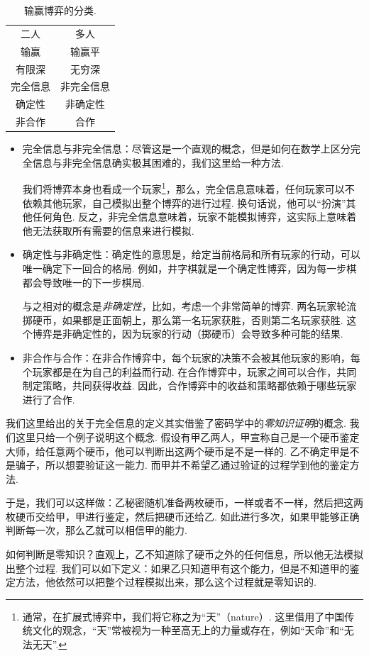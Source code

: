 \begin{table}[ht]
    \centering
    \begin{tabular}{cc}
        \toprule
        二人 & 多人 \\
        输赢 & 输赢平\\
        有限深 & 无穷深 \\
        完全信息 & 非完全信息 \\
        确定性 & 非确定性 \\
        非合作 & 合作\\
        \bottomrule
    \end{tabular}
    \caption{输赢博弈的分类.}
    \label{tab:win-lose-game}
\end{table}

\begin{itemize}
    \item 完全信息与非完全信息：尽管这是一个直观的概念，但是如何在数学上区分完全信息与非完全信息确实极其困难的，我们这里给一种方法. 
    
    我们将博弈本身也看成一个玩家\footnote{通常，在扩展式博弈中，我们将它称之为“天”（nature）. 这里借用了中国传统文化的观念，“天”常被视为一种至高无上的力量或存在，例如“天命”和“无法无天”. }，那么，完全信息意味着，任何玩家可以不依赖其他玩家，自己模拟出整个博弈的进行过程. 换句话说，他可以“扮演”其他任何角色. 反之，非完全信息意味着，玩家不能模拟博弈，这实际上意味着他无法获取所有需要的信息来进行模拟. 

    \item 确定性与非确定性：确定性的意思是，给定当前格局和所有玩家的行动，可以唯一确定下一回合的格局. 例如，井字棋就是一个确定性博弈，因为每一步棋都会导致唯一的下一步棋局.
    
    与之相对的概念是\textit{非确定性}，比如，考虑一个非常简单的博弈. 两名玩家轮流掷硬币，如果都是正面朝上，那么第一名玩家获胜，否则第二名玩家获胜. 这个博弈是非确定性的，因为玩家的行动（掷硬币）会导致多种可能的结果.

    \item 非合作与合作：在非合作博弈中，每个玩家的决策不会被其他玩家的影响，每个玩家都是在为自己的利益而行动. 在合作博弈中，玩家之间可以合作，共同制定策略，共同获得收益. 因此，合作博弈中的收益和策略都依赖于哪些玩家进行了合作. 
\end{itemize}

\begin{remark}
    我们这里给出的关于完全信息的定义其实借鉴了密码学中的\textit{零知识证明}的概念. 我们这里只给一个例子说明这个概念. 假设有甲乙两人，甲宣称自己是一个硬币鉴定大师，给任意两个硬币，他可以判断出这两个硬币是不是一样的. 乙不确定甲是不是骗子，所以想要验证这一能力. 而甲并不希望乙通过验证的过程学到他的鉴定方法. 
    
    于是，我们可以这样做：乙秘密随机准备两枚硬币，一样或者不一样，然后把这两枚硬币交给甲，甲进行鉴定，然后把硬币还给乙. 如此进行多次，如果甲能够正确判断每一次，那么乙就可以相信甲的能力. 

    如何判断是零知识？直观上，乙不知道除了硬币之外的任何信息，所以他无法模拟出整个过程. 我们可以如下定义：如果乙只知道甲有这个能力，但是不知道甲的鉴定方法，他依然可以把整个过程模拟出来，那么这个过程就是零知识的. 
\end{remark}

